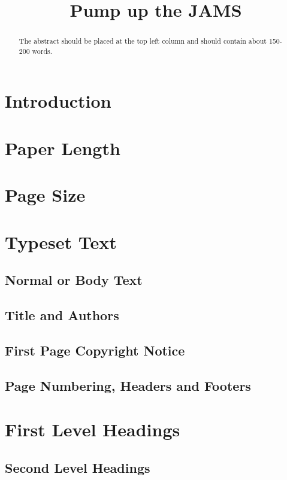 \documentclass{article}
\title{Pump up the JAMS\conferenceyear}
\begin{document}
%
\maketitle
%
\begin{abstract}
The abstract should be placed at the top left column and
should contain about 150-200 words.
\end{abstract}
%
\section{Introduction}
\label{sec:introduction}

\section{Paper Length}

\section{Page Size}\label{sec:page_size}

\section{Typeset Text}\label{sec:typeset_text}

\subsection{Normal or Body Text}\label{subsec:body}

\subsection{Title and Authors}

\subsection{First Page Copyright Notice}

\subsection{Page Numbering, Headers and Footers}


\section{First Level Headings}


\subsection{Second Level Headings}
\end{document}
